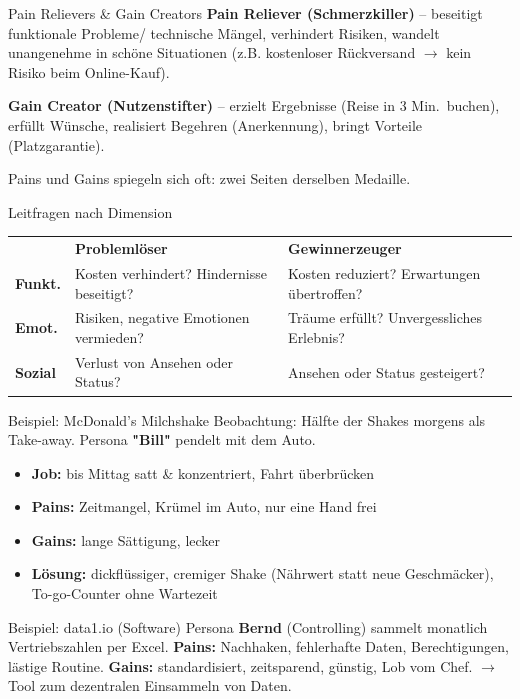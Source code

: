 \documentclass[a4paper, fontsize=7pt]{scrartcl}
\renewcommand*{\arraystretch}{1.5}  %
\begin{document}
\begin{mainbox}{Pain Relievers \& Gain Creators}
\textbf{Pain Reliever (Schmerzkiller)} -- beseitigt funktionale Probleme/
technische Mängel, verhindert Risiken, wandelt unangenehme in schöne
Situationen (z.B. kostenloser Rückversand $\to$ kein Risiko beim Online-Kauf).

\textbf{Gain Creator (Nutzenstifter)} -- erzielt Ergebnisse (Reise in 3 Min.\
buchen), erfüllt Wünsche, realisiert Begehren (Anerkennung), bringt Vorteile
(Platzgarantie).

Pains und Gains spiegeln sich oft: zwei Seiten derselben Medaille.
\end{mainbox}

\begin{subbox}{Leitfragen nach Dimension}
\renewcommand*{\arraystretch}{1.2}
\begin{tabularx}{\linewidth}{@{}lXX@{}}
 & \textbf{Problemlöser} & \textbf{Gewinn\-erzeuger} \\
\textbf{Funkt.} & Kosten verhindert? Hindernisse beseitigt? &
Kosten reduziert? Erwartungen übertroffen? \\
\textbf{Emot.} & Risiken, negative Emotionen vermieden? &
Träume erfüllt? Unvergessliches Erlebnis? \\
\textbf{Sozial} & Verlust von Ansehen oder Status? &
Ansehen oder Status gesteigert? \\
\end{tabularx}
\end{subbox}

\begin{subbox}{Beispiel: McDonald's Milchshake}
Beobachtung: Hälfte der Shakes morgens als Take-away. Persona \textbf{"Bill"}
pendelt mit dem Auto.
\begin{itemize}
    \item \textbf{Job:} bis Mittag satt \& konzentriert, Fahrt überbrücken
    \item \textbf{Pains:} Zeitmangel, Krümel im Auto, nur eine Hand frei
    \item \textbf{Gains:} lange Sättigung, lecker
    \item \textbf{Lösung:} dickflüssiger, cremiger Shake (Nährwert statt neue
    Geschmäcker), To-go-Counter ohne Wartezeit
\end{itemize}
\end{subbox}

\begin{subbox}{Beispiel: data1.io (Software)}
Persona \textbf{Bernd} (Controlling) sammelt monatlich Vertriebszahlen per
Excel. \textbf{Pains:} Nachhaken, fehlerhafte Daten, Berechtigungen,
lästige Routine. \textbf{Gains:} standardisiert, zeitsparend, günstig, Lob vom
Chef. $\to$ Tool zum dezentralen Einsammeln von Daten.
\end{subbox}
\end{document}
